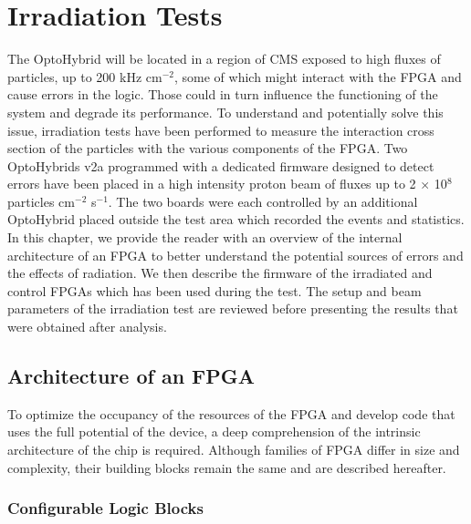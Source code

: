 \chapter{Irradiation Tests}
\label{chap:II-5-irradiation}

  The OptoHybrid will be located in a region of CMS exposed to high fluxes of particles, up to 200 kHz cm$^{-2}$, some of which might interact with the FPGA and cause errors in the logic. Those could in turn influence the functioning of the system and degrade its performance. To understand and potentially solve this issue, irradiation tests have been performed to measure the interaction cross section of the particles with the various components of the FPGA. Two OptoHybrids v2a programmed with a dedicated firmware designed to detect errors have been placed in a high intensity proton beam of fluxes up to 2 $ \times $ 10$^8$ particles cm$^{-2}$ s$^{-1}$. The two boards were each controlled by an additional OptoHybrid placed outside the test area which recorded the events and statistics. \\

  In this chapter, we provide the reader with an overview of the internal architecture of an FPGA to better understand the potential sources of errors and the effects of radiation. We then describe the firmware of the irradiated and control FPGAs which has been used during the test. The setup and beam parameters of the irradiation test are reviewed before presenting the results that were obtained after analysis.

  \section{Architecture of an FPGA}

    To optimize the occupancy of the resources of the FPGA and develop code that uses the full potential of the device, a deep comprehension of the intrinsic architecture of the chip is required. Although families of FPGA differ in size and complexity, their building blocks remain the same and are described hereafter.

    \subsection{Configurable Logic Blocks}

